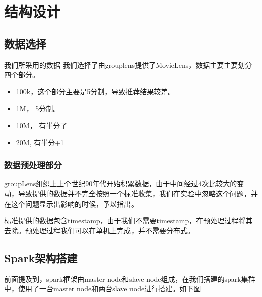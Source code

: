 \chapter{结构设计}
\section{数据选择}
我们所采用的数据\cite{Harper:2016bm}
我们选择了由grouplens提供了MovieLens，数据主要主要划分四个部分。
\begin{itemize}
    \item 100k，这个部分主要是5分制，导致推荐结果较差。
    \item 1M， 5分制。
    \item 10M， 有半分了
    \item 20M, 有半分+1
\end{itemize}

\subsection{数据预处理部分}
groupLens组织上上个世纪90年代开始积累数据，由于中间经过4次比较大的变动，导致提供的数据并不完全按照一个标准收集，我们在实验中忽略这个问题，并在这个问题显示出影响的时候，予以指出。

标准提供的数据包含timestamp，由于我们不需要timestamp，在预处理过程将其去除。预处理过程我们可以在单机上完成，并不需要分布式。

\section{Spark架构搭建}
前面提及到，spark框架由master node和slave node组成，在我们搭建的spark集群中，使用了一台master node和两台slave node进行搭建。如下图
